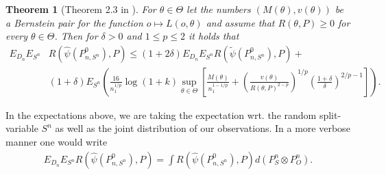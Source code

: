 \documentclass[11pt, a4paper]{article}
\newtheorem{theorem}{Theorem}
\theoremstyle{definition}
\theoremstyle{remark}
\newcommand{\btheta}{\theta}
\newcommand{\la}{\psi}
\newcommand{\Sn}{S^n}
\begin{document}
\begin{theorem}[Theorem 2.3 in \parencite{vaart06}] \label{finitesample}
   For $ \btheta \in \Theta $ let the numbers $ (M(\btheta) , v(\btheta)) $ be a Bernstein pair for the function $ o \mapsto L(o, \btheta) $ and assume that $ R(\btheta, P) \geq 0 $ for every $ \btheta \in \Theta $. Then for $ \delta > 0 $ and $ 1 \leq p \leq 2 $ it holds that 
   \begin{align*}
       E_{D_n} E_{\Sn} &R(\hat{\la}(P_{n, \Sn}^{0}), P) \leq(1 + 2 \delta) E_{D_n} E_{\Sn} R( \tilde{\la}(P_{n,\Sn}^{0}), P) +\\
                       &(1 + \delta) E_{\Sn} \left(  \frac{16}{n_1^{1/p}} \log (1 +k) \sup_{\btheta \in \Theta} \left[ \frac{M(\btheta)}{n_1^{1-1/p}} +  \left( \frac{v(\btheta)}{R(\btheta, P)^{2-p}} \right)^{1/p} \left( \frac{1 + \delta}{\delta} \right)^{2/p-1} \right]\right).
   \end{align*}
\end{theorem}
In the expectations above, we are taking the expectation wrt. the random split-variable $ \Sn $ as well as the joint distribution of our observations. In a more verbose manner one would write 
\begin{align*}
     E_{D_n} E_{\Sn}  R(\hat{\la}(P_{n, \Sn}^{0}), P) = \int R(\hat{\la}(P_{n, \Sn}^{0}), P) d (P_\Sn \otimes  P^{n}_O ).
\end{align*}
\end{document}
